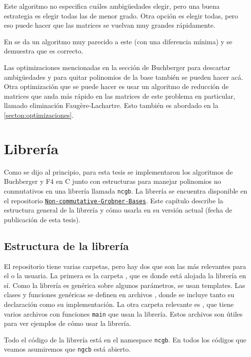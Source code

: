 \documentclass[12pt]{report}
\theoremstyle{customstyle}
\theoremstyle{factstyle}
\newcommand\cpp{C\nolinebreak[4]\hspace{-.05em}\raisebox{.4ex}{\relsize{-3}{\textbf{++}}}\xspace}
\begin{document}
Este algoritmo no especifica cuáles ambigüedades elegir, pero una buena estrategia es elegir todas las de menor grado. Otra opción es elegir todas, pero eso puede hacer que las matrices se vuelvan muy grandes rápidamente.

En \cite{thesis:Hof20} se da un algoritmo muy parecido a este (con una diferencia mínima) y se demuestra que es correcto.

Las optimizaciones mencionadas en la sección de Buchberger para descartar ambigüedades y para quitar polinomios de la base también se pueden hacer acá. Otra optimización que se puede hacer es usar un algoritmo de reducción de matrices que anda más rápido en las matrices de este problema en particular, llamado eliminación Faugère-Lachartre. Esto también es abordado en la \cref{secton:optimizaciones}.

\chapter{Librería}

Como se dijo al principio, para esta tesis se implementaron los algoritmos de Buchberger y F4 en \cpp junto con estructuras para manejar polinomios no conmutativos en una librería llamada \texttt{ncgb}. La librería  se encuentra disponible en el repositorio \href{https://github.com/IvanRenison/Non-commutative-Grobner-Bases}{\texttt{Non-commutative-Grobner-Bases}}. Este capítulo describe la estructura general de la librería y cómo usarla en su versión actual (fecha de publicación de esta tesis).

\section{Estructura de la librería}

El repositorio tiene varias carpetas, pero hay dos que son las más relevantes para el o la usuaria. La primera es la carpeta , que es donde está alojada la librería en sí. Como la librería es genérica sobre algunos parámetros, se usan templates. Las clases y funciones genéricas se definen en archivos , donde se incluye tanto su declaración como su implementación. La otra carpeta relevante es , que tiene varios archivos  con funciones \texttt{main} que usan la librería. Estos archivos son útiles para ver ejemplos de cómo usar la librería.

Todo el código de la librería está en el namespace \texttt{ncgb}. En todos los códigos que veamos asumiremos que \texttt{ngcb} está abierto.
\end{document}
